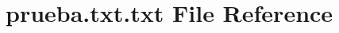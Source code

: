 \hypertarget{prueba_8txt_8txt}{}\section{prueba.\+txt.\+txt File Reference}
\label{prueba_8txt_8txt}
